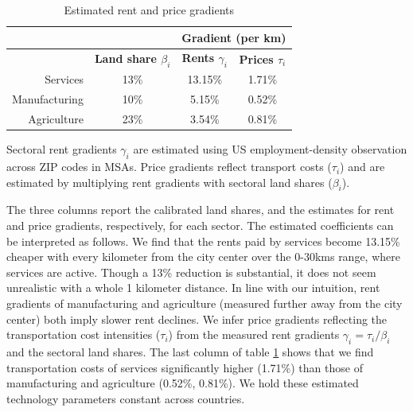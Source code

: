 \documentclass[12pt]{article}
\begin{document}
\begin{table}[h!]
  \begin{center}
  \caption{Estimated rent and price gradients}
    \begin{tabular}{rccc}
    \toprule
    \textbf{} & \textbf{} & \multicolumn{2}{c}{\textbf{Gradient (per km)}}\\
    \midrule
    \textbf{} & \textbf{Land share $\beta_i$ } & \textbf{Rents $\gamma_i$} & \textbf{Prices $\tau_i$} \\
    Services & 13\%  & 13.15\% & 1.71\% \\
    Manufacturing & 10\%  & 5.15\% & 0.52\% \\
    Agriculture & 23\%  & 3.54\% & 0.81\% \\
    \bottomrule
    \end{tabular}%

  \end{center}
  \label{tab:EmpGrad}%

  \noindent \footnotesize{Sectoral rent gradients $\gamma_i$ are estimated using US employment-density observation across ZIP codes in MSAs. Price gradients reflect transport costs ($\tau_i$) and are estimated by multiplying rent gradients with sectoral land shares ($\beta_i$). }
\end{table}%

The three columns report the calibrated land shares, and the estimates for rent and price gradients, respectively, for each sector. The estimated coefficients can be interpreted as follows. We find that the rents paid by services become 13.15\% cheaper with every kilometer from the city center over the 0-30kms range, where services are active. Though a 13\% reduction is substantial, it does not seem unrealistic with a whole 1 kilometer distance. In line with our intuition, rent gradients of manufacturing and agriculture (measured further away from the city center) both imply slower rent declines. We infer price gradients reflecting the transportation cost intensities ($\tau_i$) from the measured rent gradients $\gamma_i=\tau_i/\beta_i$ and the sectoral land shares. The last column of table \ref{tab:EmpGrad} shows that we find transportation costs of services significantly higher (1.71\%) than those of manufacturing and agriculture (0.52\%, 0.81\%). We hold these estimated technology parameters constant across countries. %
\end{document}
